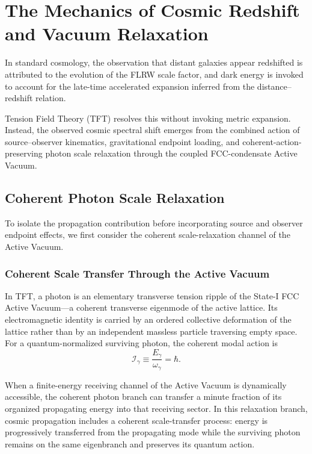 \chapter{The Mechanics of Cosmic Redshift and Vacuum Relaxation}
\label{chap:cosmic_redshift}

In standard cosmology, the observation that distant galaxies appear redshifted is attributed to the evolution of the FLRW scale factor, and dark energy is invoked to account for the late-time accelerated expansion inferred from the distance--redshift relation.

Tension Field Theory (TFT) resolves this without invoking metric expansion. Instead, the observed cosmic spectral shift emerges from the combined action of source--observer kinematics, gravitational endpoint loading, and coherent-action-preserving photon scale relaxation through the coupled FCC-condensate Active Vacuum.

\section{Coherent Photon Scale Relaxation}
\label{sec:vacuum_viscosity}

To isolate the propagation contribution before incorporating source and observer endpoint effects, we first consider the coherent scale-relaxation channel of the Active Vacuum.

\subsection{Coherent Scale Transfer Through the Active Vacuum}

In TFT, a photon is an elementary transverse tension ripple of the State-I FCC Active Vacuum---a coherent transverse eigenmode of the active lattice. Its electromagnetic identity is carried by an ordered collective deformation of the lattice rather than by an independent massless particle traversing empty space. For a quantum-normalized surviving photon, the coherent modal action is
\begin{equation}
    \mathcal I_\gamma
    \equiv
    \frac{E_\gamma}{\omega_\gamma}
    =
    \hbar.
\end{equation}

When a finite-energy receiving channel of the Active Vacuum is dynamically accessible, the coherent photon branch can transfer a minute fraction of its organized propagating energy into that receiving sector. In this relaxation branch, cosmic propagation includes a coherent scale-transfer process: energy is progressively transferred from the propagating mode while the surviving photon remains on the same eigenbranch and preserves its quantum action.


